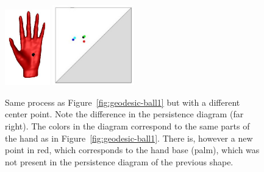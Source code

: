 \begin{figure}[t!]
\begin{center}
\includegraphics[height = 3.3cm]{figures/dist12}
\includegraphics[height = 3.5cm]{figures/PD2}  
\caption[Geodesic balls]{\label{fig:geodesic-ball2} Same process as
  Figure~\ref{fig:geodesic-ball1} but with a different center
  point. Note the difference in the persistence diagram (far
  right). The colors in the diagram correspond to the same parts of
  the hand as in Figure~\ref{fig:geodesic-ball1}. There is, however a
  new point in red, which corresponds to the hand base (palm), which
  was not present in the persistence diagram of the previous shape.}
\end{center} 
\end{figure}





